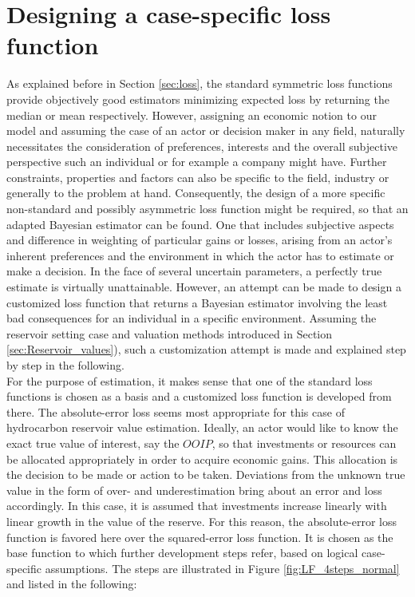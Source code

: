 		\section{Designing a case-specific loss function}\label{sec:LF_design}	
		As explained before in Section \ref{sec:loss}, the standard symmetric loss functions provide objectively good estimators minimizing expected loss by returning the median or mean respectively. However, assigning an economic notion to our model and assuming the case of an actor or decision maker in any field, naturally necessitates the consideration of preferences, interests and the overall subjective perspective such an individual or for example a company might have. Further constraints, properties and factors can also be specific to the field, industry or generally to the problem at hand. Consequently, the design of a more specific non-standard and possibly asymmetric loss function might be required, so that an adapted Bayesian estimator can be found. One that includes subjective aspects and difference in weighting of particular gains or losses, arising from an actor's inherent preferences and the environment in which the actor has to estimate or make a decision. In the face of several uncertain parameters, a perfectly true estimate is virtually unattainable. However, an attempt can be made to design a customized loss function that returns a Bayesian estimator involving the least bad consequences for an individual in a specific environment. Assuming the reservoir setting case and valuation methods introduced in Section \ref{sec:Reservoir_values}), such a customization attempt is made and explained step by step in the following.\\
		For the purpose of estimation, it makes sense that one of the standard loss functions is chosen as a basis and a customized loss function is developed from there. The absolute-error loss seems most appropriate for this case of hydrocarbon reservoir value estimation. Ideally, an actor would like to know the exact true value of interest, say the $OOIP$, so that investments or resources can be allocated appropriately in order to acquire economic gains. This allocation is the decision to be made or action to be taken. Deviations from the unknown true value in the form of over- and underestimation bring about an error and loss accordingly. In this case, it is assumed that investments increase linearly with linear growth in the value of the reserve. For this reason, the absolute-error loss function is favored here over the squared-error loss function. It is chosen as the base function to which further development steps refer, based on logical case-specific assumptions. The steps are illustrated in Figure \ref{fig:LF_4steps_normal} and listed in the following:
